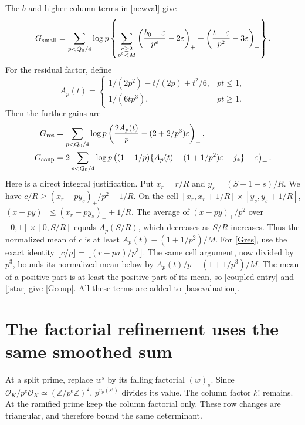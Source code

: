 \documentclass[11pt]{article}
\newcommand{\Z}{\mathbb Z}
\newcommand{\OK}{\mathcal O_K}
\begin{document}
The \(b\) and higher-column terms in \eqref{newval} give
\begin{equation}\label{Gsmall}
 G_{\rm small}=\sum_{p<Q_0/4}\log p\left\{
 \sum_{\substack{e\ge2\\p^e<M}}
       \left(\frac{b_0-\varepsilon}{p^e}-2\varepsilon\right)_+
 +\left(\frac{t-\varepsilon}{p^2}-3\varepsilon\right)_+
 \right\}.
\end{equation}
For the residual factor, define
\[
 A_p(t)=
 \begin{cases}
  1/(2p^2)-t/(2p)+t^2/6,&pt\le1,\\
  1/(6tp^3),&pt\ge1.
 \end{cases}
\]
Then the further gains are
\begin{align}
 G_{\rm res}&=\sum_{p<Q_0/4}\log p
       \left(\frac{2A_p(t)}p-(2+2/p^3)\varepsilon\right)_+,
       \label{Gres}\\
 G_{\rm coup}&=2\sum_{p<Q_0/4}\log p
       \left((1-1/p)\{A_p(t)-(1+1/p^2)\varepsilon-j_*\}
                         -\varepsilon\right)_+.
       \label{Gcoup}
\end{align}
Here is a direct integral justification. Put \(x_r=r/R\) and
\(y_s=(S-1-s)/R\). We have
\(c/R\ge (x_r-py_s)_+/p^2-1/R\).
On the cell \([x_r,x_r+1/R]\times[y_s,y_s+1/R]\),
\((x-py)_+\le(x_r-py_s)_++1/R\).
The average of \((x-py)_+/p^2\) over
\([0,1]\times[0,S/R]\) equals \(A_p(S/R)\), which decreases
as \(S/R\) increases. Thus the normalized mean of
\(c\) is at least \(A_p(t)-(1+1/p^2)/M\).
For \eqref{Gres}, use the exact identity
\(\lfloor c/p\rfloor=\lfloor(r-pa)/p^3\rfloor\).
The same cell argument, now divided by \(p^3\), bounds its
normalized mean below by \(A_p(t)/p-(1+1/p^3)/M\).
The mean of a positive part is at least the positive
part of its mean, so \eqref{coupled-entry} and \eqref{jstar} give
\eqref{Gcoup}. All these terms are added to \eqref{basevaluation}.

\section{The factorial refinement uses the same smoothed sum}
At a split prime, replace \(w^s\) by its falling factorial
\((w)_s\). Since \(\OK/p^e\OK\simeq(\Z/p^e\Z)^2\),
\(p^{v_p(s!)}\) divides its value. The column factor \(k!\) remains.
At the ramified prime keep the column factorial only. These row
changes are triangular, and therefore bound the same determinant.
\end{document}
